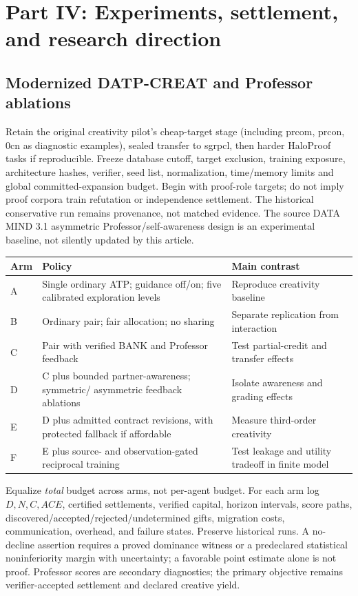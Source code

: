 \documentclass[11pt]{article}
\theoremstyle{definition}\newtheorem{definition}[theorem]{Definition}\newtheorem{conjecture}[theorem]{Conjecture}\newtheorem{example}[theorem]{Example}
\begin{document}
\section{Part IV: Experiments, settlement, and research direction}
\subsection{Modernized DATP-CREAT and Professor ablations}
Retain the original creativity pilot's cheap-target stage (including prcom, prcon, 0cn as diagnostic examples), sealed transfer to sgrpcl, then harder HaloProof tasks if reproducible. Freeze database cutoff, target exclusion, training exposure, architecture hashes, verifier, seed list, normalization, time/memory limits and global committed-expansion budget. Begin with proof-role targets; do not imply proof corpora train refutation or independence settlement. The historical conservative run remains provenance, not matched evidence. The source DATA MIND 3.1 asymmetric Professor/self-awareness design is an experimental baseline, not silently updated by this article.

\begin{center}\small
\begin{tabularx}{\linewidth}{@{}p{.14\linewidth}X X@{}}\toprule
Arm & Policy & Main contrast\\\midrule
A & Single ordinary ATP; guidance off/on; five calibrated exploration levels & Reproduce creativity baseline\\
B & Ordinary pair; fair allocation; no sharing & Separate replication from interaction\\
C & Pair with verified BANK and Professor feedback & Test partial-credit and transfer effects\\
D & C plus bounded partner-awareness; symmetric/ asymmetric feedback ablations & Isolate awareness and grading effects\\
E & D plus admitted contract revisions, with protected fallback if affordable & Measure third-order creativity\\
F & E plus source- and observation-gated reciprocal training & Test leakage and utility tradeoff in finite model\\\bottomrule
\end{tabularx}
\end{center}
Equalize \emph{total} budget across arms, not per-agent budget. For each arm log $D,N,C,ACE$, certified settlements, verified capital, horizon intervals, score paths, discovered/accepted/rejected/undetermined gifts, migration costs, communication, overhead, and failure states. Preserve historical runs. A no-decline assertion requires a proved dominance witness or a predeclared statistical noninferiority margin with uncertainty; a favorable point estimate alone is not proof. Professor scores are secondary diagnostics; the primary objective remains verifier-accepted settlement and declared creative yield.
\end{document}
